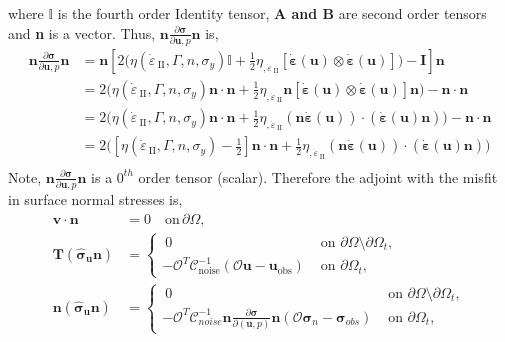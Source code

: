 \documentclass[12pt]{article}
\newcommand{\IIinv}{{\dot\varepsilon}_{\mathrm{\!\!\:II}}}
\newcommand{\uu}{{\ensuremath{\boldsymbol{u}}}}
\newcommand{\vv}{{\ensuremath{\boldsymbol{v}}}}
\newcommand{\ssigma}{{\ensuremath{\boldsymbol{\sigma}}}}
\newcommand{\strain}{{\ensuremath{\dot{\boldsymbol{\varepsilon}}}}}
\begin{document}
where $\mathbb{I}$ is the fourth order Identity tensor, \textbf{A and B} are second order tensors and \textbf{n} is a vector.
Thus, $\textbf{n}\frac{\partial \ssigma}{\partial \uu, p}\textbf{n}$ is,
\begin{equation}
\begin{split}
\textbf{n}\frac{\partial \ssigma}{\partial \uu, p}\textbf{n} &= \textbf{n}[2 \Big(\eta(\IIinv,\Gamma, n,\sigma_y)\mathbb{I}+\frac{1}{2} \eta_{,\IIinv} [\strain(\uu)\otimes
      \strain(\uu)]\Big) -\textbf{I}]\textbf{n} \\
&=2 \Big(\eta(\IIinv,\Gamma, n,\sigma_y)\textbf{n}\cdot\textbf{n}+\frac{1}{2} \eta_{,\IIinv} \textbf{n}[\strain(\uu)\otimes
  \strain(\uu)]\textbf{n}\Big) -\textbf{n}\cdot\textbf{n} \\
&=2 \Big(\eta(\IIinv,\Gamma, n,\sigma_y)\textbf{n}\cdot\textbf{n}+\frac{1}{2} \eta_{,\IIinv} (\textbf{n}\strain(\uu))
      \cdot (\strain(\uu)\textbf{n})\Big) -\textbf{n}\cdot\textbf{n} \\
&=2 \Big([\eta(\IIinv,\Gamma, n,\sigma_y)-\frac{1}{2}]\textbf{n}\cdot\textbf{n}+\frac{1}{2} \eta_{,\IIinv} (\textbf{n}\strain(\uu))
      \cdot (\strain(\uu)\textbf{n})\Big)  \\
\end{split}
\end{equation}
Note, $\textbf{n}\frac{\partial \ssigma}{\partial \uu, p}\textbf{n}$ is a $0^{th}$ order tensor (scalar). Therefore the adjoint with the misfit in surface normal stresses is,
\begin{align*}
  \vv\cdot \textbf{n}&=0 \quad \text{on} \, \partial \Omega, \\
  \textbf{T}(\hat\ssigma_\uu \textbf{n})
  &=\begin{cases} \:0 & \text{ on }\partial \Omega\setminus
  \partial\Omega_t, \\
  -\mathcal{O}^T\mathcal{C}^{-1}_{\text{noise}}(\mathcal O \uu-\uu_{\text{obs}}) &\text{ on }
  \partial\Omega_t,
  \end{cases} \\
  \textbf{n}(\hat\ssigma_\uu\textbf{n})
  &=\begin{cases} \:0 & \text{ on }\partial \Omega\setminus
  \partial\Omega_t, \\
  -\mathcal{O}^T\mathcal{C}^{-1}_{noise}\textbf{n}\frac{\partial \ssigma}{\partial (\uu,p)}\textbf{n}(\mathcal{O}\ssigma_n-\ssigma_{obs}) &\text{ on }
  \partial\Omega_t,
  \end{cases}  
  \label{eq:adjoint}
\end{align*}
\end{document}
